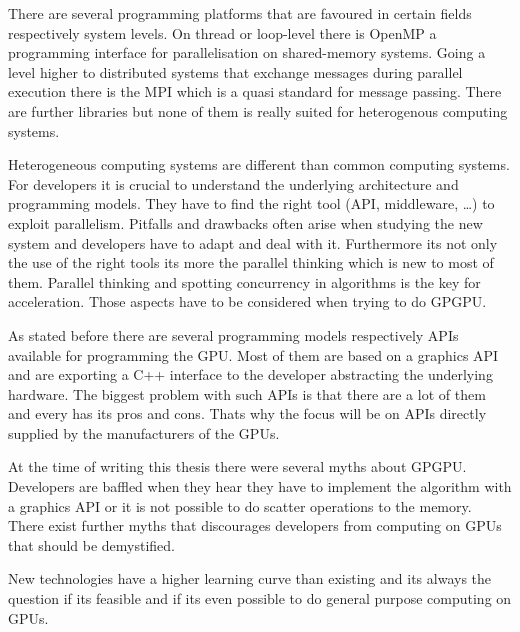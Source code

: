 
There are several programming platforms that are favoured in certain fields 
respectively system levels. On thread or loop-level there is OpenMP a programming
interface for parallelisation on shared-memory systems. Going a level higher to
distributed systems that exchange messages during parallel execution there is the
\gls{MPI} which is a quasi standard for message passing. There are further 
libraries but none of them is really suited for heterogenous computing systems.

Heterogeneous computing systems are different than common computing systems. For
developers it is crucial to understand the underlying architecture and
programming models. They have to find the right tool (\gls{API}, middleware,
\ldots) to exploit parallelism. Pitfalls and drawbacks often arise when studying
the new system and developers have to adapt and deal with it. Furthermore its
not only the use of the right tools its more the parallel thinking which is new
to most of them. Parallel thinking and spotting concurrency in algorithms is the
key for acceleration. Those aspects have to be considered when trying to do
\gls{GPGPU}.


As stated before there are several programming models respectively \glspl{API} 
available for programming the \gls{GPU}. Most of them are based on a graphics 
\gls{API} and are exporting a C++ interface to the developer abstracting
the underlying hardware. The biggest problem with such \glspl{API} is that 
there are a lot of them and every has its pros and cons. Thats why the focus
will be on \glspl{API} directly supplied by the manufacturers of the \glspl{GPU}.

At the time of writing this thesis there were several myths about \gls{GPGPU}.
Developers are baffled when they hear they have to implement the algorithm with
a graphics \gls{API} or it is not possible to do scatter operations to the memory.
There exist further myths that discourages developers from computing on
\glspl{GPU} that should be demystified. 

New technologies have a higher learning curve than existing and its always the 
question if its feasible and if its even possible to do general purpose computing
on \glspl{GPU}. 

